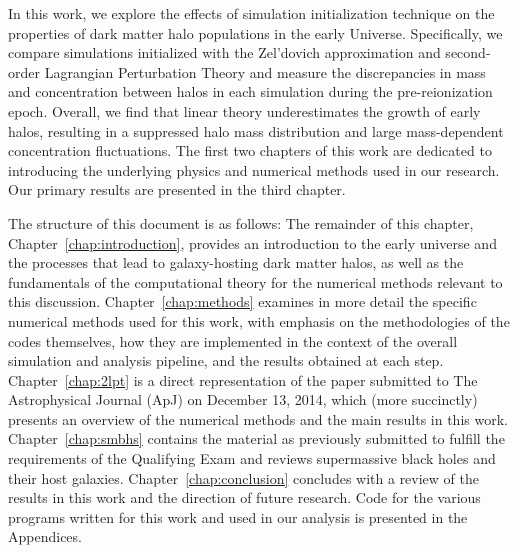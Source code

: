 
%
%
%
%


In this work, we explore the effects of simulation initialization technique on the properties of dark matter halo populations in the early Universe.  Specifically, we compare simulations initialized with the Zel'dovich approximation and second-order Lagrangian Perturbation Theory and measure the discrepancies in mass and concentration between halos in each simulation during the pre-reionization epoch.  Overall, we find that linear theory underestimates the growth of early halos, resulting in a suppressed halo mass distribution and large mass-dependent concentration fluctuations.  The first two chapters of this work are dedicated to introducing the underlying physics and numerical methods used in our research.  Our primary results are presented in the third chapter.

The structure of this document is as follows:  The remainder of this chapter, Chapter~\ref{chap:introduction}, provides an introduction to the early universe and the processes that lead to galaxy-hosting dark matter halos, as well as the fundamentals of the computational theory for the numerical methods relevant to this discussion.  Chapter~\ref{chap:methods} examines in more detail the specific numerical methods used for this work, with emphasis on the methodologies of the codes themselves, how they are implemented in the context of the overall simulation and analysis pipeline, and the results obtained at each step.  Chapter~\ref{chap:2lpt} is a direct representation of the paper submitted to The Astrophysical Journal (ApJ) on December 13, 2014, which (more succinctly) presents an overview of the numerical methods and the main results in this work.  Chapter~\ref{chap:smbhs} contains the material as previously submitted to fulfill the requirements of the Qualifying Exam and reviews supermassive black holes and their host galaxies.  Chapter~\ref{chap:conclusion} concludes with a review of the results in this work and the direction of future research.  Code for the various programs written for this work and used in our analysis is presented in the Appendices.




